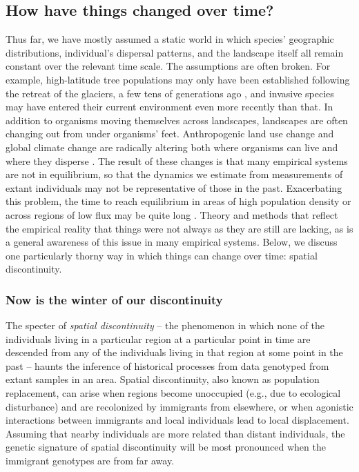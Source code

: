 \documentclass{ar-1col}
\begin{document}
\subsection{How have things changed over time?}

Thus far, we have mostly assumed a static world
in which species' geographic distributions,
individual's dispersal patterns,
and the landscape itself all remain constant over the relevant time scale.
The assumptions are often broken.
For example, 
high-latitude tree populations may only have been established
following the retreat of the glaciers,
a few tens of generations ago \citep{WhitlockMcCauley1999},
and invasive species may have entered their current
environment even more recently than that.
In addition to organisms moving themselves across landscapes,
landscapes are often changing out from under organisms' feet.
Anthropogenic land use change
and global climate change
are radically altering both where organisms can live
and where they disperse \citep{parmesan1999}.
The result of these changes is that many empirical systems
are not in equilibrium,
so that the dynamics we estimate from
measurements of extant individuals may
not be representative of those in the past.
Exacerbating this problem,
the time to reach equilibrium
in areas of high population density
or across regions of low flux
may be quite long
\citep{CrowAoki1984group, whitlock1992temporal, slatkin1993isolation, WhitlockMcCauley1999}.
Theory and methods that
reflect the empirical reality that things were not always as they are
still are lacking, 
as is a general awareness of this issue in many empirical systems.
Below, we discuss one particularly thorny way in which 
things can change over time: spatial discontinuity.


\subsubsection{Now is the winter of our discontinuity}

The specter of \textit{spatial discontinuity} --
the phenomenon in which none of the individuals 
living in a particular region at a particular point in time 
are descended from any of the individuals living in that region 
at some point in the past
-- haunts the inference of historical processes
from data genotyped from extant samples in an area.
Spatial discontinuity, 
also known as population replacement, 
can arise when regions become unoccupied
(e.g., due to ecological disturbance) 
and are recolonized by immigrants from elsewhere, 
or when agonistic interactions between immigrants and local individuals 
lead to local displacement. 
Assuming that nearby individuals are more related than distant individuals, 
the genetic signature of spatial discontinuity will be most pronounced 
when the immigrant genotypes are from far away.
\end{document}
